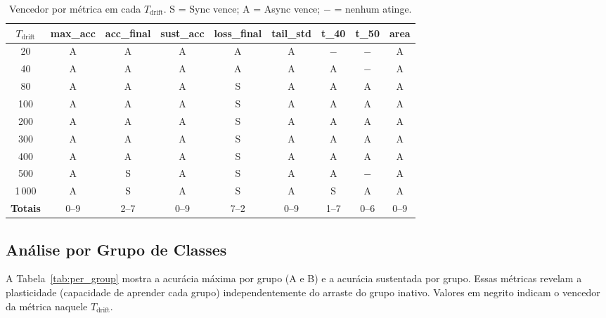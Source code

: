 \documentclass[12pt, a4paper]{article}
\begin{document}
\begin{table}[H]
\centering
\caption{Vencedor por métrica em cada $T_{\text{drift}}$.
  S = Sync vence; A = Async vence; $-$ = nenhum atinge.}
\label{tab:winners}
\renewcommand{\arraystretch}{1.15}
\footnotesize
\begin{tabular}{c|cccccccc}
\toprule
$T_{\text{drift}}$ & max\_acc & acc\_final & sust\_acc & loss\_final & tail\_std & t\_40 & t\_50 & area \\
\midrule
20   & A & A & A & A & A & $-$ & $-$ & A \\
40   & A & A & A & A & A & A & $-$ & A \\
80   & A & A & A & S & A & A & A & A \\
100  & A & A & A & S & A & A & A & A \\
200  & A & A & A & S & A & A & A & A \\
300  & A & A & A & S & A & A & A & A \\
400  & A & A & A & S & A & A & A & A \\
500  & A & S & A & S & A & A & $-$ & A \\
1\,000 & A & S & A & S & A & S & A & A \\
\midrule
\textbf{Totais} & 0--9 & 2--7 & 0--9 & 7--2 & 0--9 & 1--7 & 0--6 & 0--9 \\
\bottomrule
\end{tabular}
\end{table}

\subsection{Análise por Grupo de Classes}

A Tabela~\ref{tab:per_group} mostra a acurácia máxima por grupo (A e B) e
a acurácia sustentada por grupo. Essas métricas revelam a plasticidade
(capacidade de aprender cada grupo) independentemente do arraste do grupo
inativo. Valores em negrito indicam o vencedor da métrica naquele
$T_{\text{drift}}$.
\end{document}

